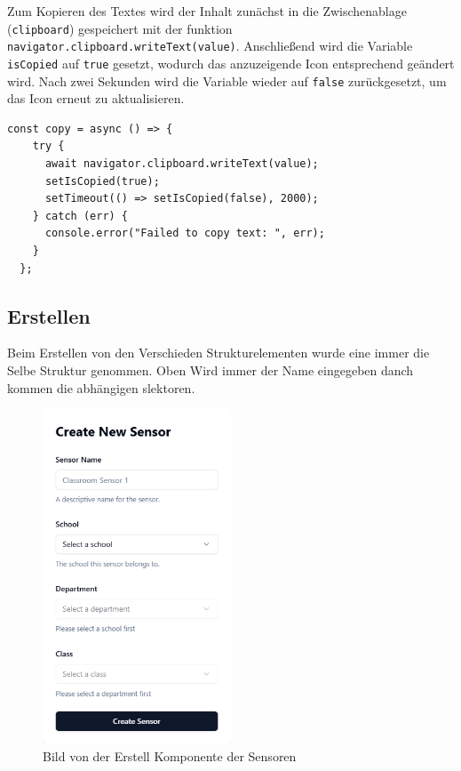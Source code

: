 \begin{inhalt}
\begin{enumerate}[label=\textbf{\arabic*.}]
Zum Kopieren des Textes wird der Inhalt zunächst in die Zwischenablage (\texttt{clipboard}) gespeichert mit der funktion \texttt{navigator.clipboard.writeText(value)}. 
Anschließend wird die Variable \texttt{isCopied} auf \texttt{true} gesetzt, wodurch das anzuzeigende Icon entsprechend geändert wird.  
Nach zwei Sekunden wird die Variable wieder auf \texttt{false} zurückgesetzt, um das Icon erneut zu aktualisieren.


\begin{lstlisting}[language=mytsx]
const copy = async () => {
    try {
      await navigator.clipboard.writeText(value);
      setIsCopied(true);
      setTimeout(() => setIsCopied(false), 2000);
    } catch (err) {
      console.error("Failed to copy text: ", err);
    }
  };
\end{lstlisting}

\clearpage

\subsection{Erstellen}

Beim Erstellen von den Verschieden Strukturelementen wurde eine immer die Selbe Struktur genommen. Oben Wird immer der Name eingegeben danch kommen die abhängigen slektoren.

\begin{figure}[!htb]
\centering
\includegraphics[width=0.5\textwidth]{files/Thomas/pics/Website/admin/sensors/sensor-create.png}
\caption[Bild von der Erstell Komponente der Sensoren]{Bild von der Erstell Komponente der Sensoren}
\label{fig:sensor-create}
\end{figure}


\end{enumerate}
\end{inhalt}

